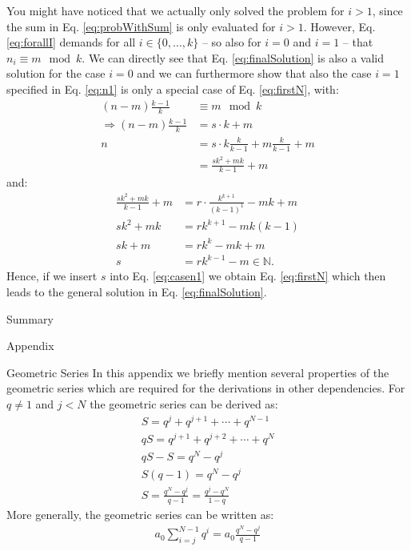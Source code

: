\documentclass[11pt]{article}
\begin{document}
You might have noticed that we actually only solved the problem for $i>1$, since the sum in Eq. \eqref{eq:probWithSum} is only evaluated for $i>1$. However, Eq. \eqref{eq:forallI} demands for all $i \in \{0, \ldots, k \}$ -- so also for $i=0$ and $i=1$ -- that $n_i \equiv m\mod k$. We can directly see that Eq. \eqref{eq:finalSolution} is also a valid solution for the case $i=0$ and we can furthermore show that also the case $i=1$ specified in Eq. \eqref{eq:n1} is only a special case of Eq. \eqref{eq:firstN}, with:
\begin{align}
	(n-m)\frac{k-1}{k} &\equiv m\mod k \\
	\Rightarrow (n-m)\frac{k-1}{k} &= s \cdot k + m \\
	n &= s \cdot k\frac{k}{k-1} + m\frac{k}{k-1} + m \\
	&= \frac{sk^2+mk}{k-1} + m \label{eq:casen1}
\end{align}
and:
\begin{align}
	\frac{sk^2+mk}{k-1} + m &= r\cdot \frac{k^{k+1}}{(k-1)^1} - mk + m \\
	sk^2+mk &= r k^{k+1} - mk(k-1) \\
	sk +m &= rk^k - mk + m \\
	s &= rk^{k-1} - m \in \mathbb{N}. 
\end{align}
Hence, if we insert $s$ into Eq. \eqref{eq:casen1} we obtain Eq. \eqref{eq:firstN} which then leads to the general solution in Eq. \eqref{eq:finalSolution}.

Summary

Appendix

Geometric Series 
In this appendix we briefly mention several properties of the geometric series which are required for the derivations in other dependencies.
For $q \neq 1$ and $j<N$ the geometric series can be derived as:
\begin{equation}
\begin{split}
S = q^{j}+q^{j+1}+ \cdots + q^{N-1} \\
qS = q^{j+1} + q^{j+2} + \cdots + q^N \\
qS - S = q^N - q^j \\
S(q-1) = q^N - q^j \\
S = \frac{q^N - q^j}{q-1} = \frac{q^j-q^N}{1-q}
\end{split}
\label{eq:geometricSeries1}
\end{equation}
More generally, the geometric series can be written as:
\begin{equation}
\begin{split}
a_0 \sum_{i=j}^{N-1} {q^i} = a_0 \frac{q^N - q^j}{q-1}
\end{split}
\label{eq:geometricSeries2}
\end{equation}
\end{document}
